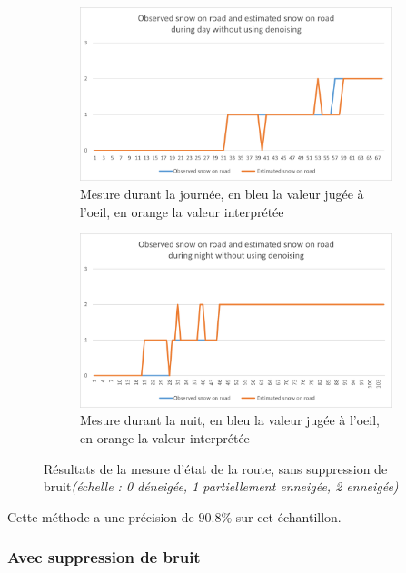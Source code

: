 \begin{figure}[H]
\begin{subfigure}{.45\textwidth}
        \includegraphics[width=\linewidth]{Images/computer_vision/snowOnRoad/dayResults_noise.png}
        \caption{Mesure durant la journée, en bleu la valeur jugée à l'oeil, en orange la valeur interprétée}
        \label{fig:SnowOnRoad_noise_dayResults}
    \end{subfigure}
    \hfill
    \begin{subfigure}{.45\textwidth}
        \includegraphics[width=\linewidth]{Images/computer_vision/snowOnRoad/nightResults_noise.png}
        \caption{Mesure durant la nuit, en bleu la valeur jugée à l'oeil, en orange la valeur interprétée}
        \label{fig:SnowOnRoad_noise_nightResults}
    \end{subfigure}
    \caption{Résultats de la mesure d'état de la route, sans suppression de bruit\emph{(échelle : 0 déneigée, 1 partiellement enneigée, 2 enneigée)}}
    \label{fig:SnowOnRoad_noise_results}
\end{figure}
Cette méthode a une précision de $90.8\%$ sur cet échantillon.\newpage

\subsubsection{Avec suppression de bruit}


